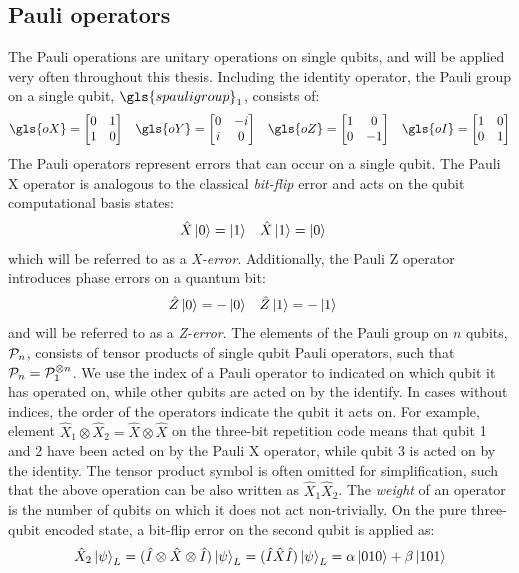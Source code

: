\subsection{Pauli operators}\label{subsec:pauli}

The Pauli operations are unitary operations on single qubits, and will be applied very often throughout this thesis. Including the identity operator, the Pauli group on a single qubit, $\gls{spauligroup}_1$, consists of:
\begin{align}
  \gls{oX} = \begin{bmatrix} 0 & 1 \\ 1 & 0 \end{bmatrix} &&
  \gls{oY} = \begin{bmatrix} 0 & -i \\ i & 0 \end{bmatrix} &&
  \gls{oZ} = \begin{bmatrix} 1 & 0 \\ 0 & -1 \end{bmatrix} &&
  \gls{oI} = \begin{bmatrix} 1 & 0 \\ 0 & 1 \end{bmatrix}
\end{align}
The Pauli operators represent errors that can occur on a single qubit. The Pauli X operator is analogous to the classical \emph{bit-flip} error and acts on the qubit computational basis states:
\begin{align}\label{eqq:qec_bitflip}
  & \hat{X}\ket{0} = \ket{1} && \hat{X}\ket{1} = \ket{0} &
\end{align}
which will be referred to as a \emph{X-error}. Additionally, the Pauli Z operator introduces phase errors on a quantum bit:
\begin{align}\label{eq:eqc_phaseflip}
  & \hat{Z}\ket{0} = -\ket{0} && \hat{Z}\ket{1} = -\ket{1} &
\end{align}
and will be referred to as a \emph{Z-error}. The elements of the Pauli group on $n$ qubits, $\mathcal{P}_n$, consists of tensor products of single qubit Pauli operators, such that  $\mathcal{P}_n = \mathcal{P}_1^{\otimes n}$. We use the index of a Pauli operator to indicated on which qubit it has operated on, while other qubits are acted on by the identify. In cases without indices, the order of the operators indicate the qubit it acts on. For example, element $\hat{X}_1\otimes \hat{X}_2=\hat{X}\otimes \hat{X}$ on the three-bit repetition code means that qubit 1 and 2 have been acted on by the Pauli X operator, while qubit 3 is acted on by the identity. The tensor product symbol is often omitted for simplification, such that the above operation can be also written as $\hat{X}_1\hat{X}_2$. The \emph{weight} of an operator is the number of qubits on which it does not act non-trivially. On the pure  three-qubit encoded state, a bit-flip error on the second qubit is applied as:
\begin{equation}\label{eq:qec_3bitflip}
  \hat{X}_2\ket{\psi}_L = (\hat{I}\otimes \hat{X} \otimes \hat{I}) \ket{\psi}_L = (\hat{I} \hat{X} \hat{I}) \ket{\psi}_L= \alpha\ket{010} + \beta\ket{101}
\end{equation}

